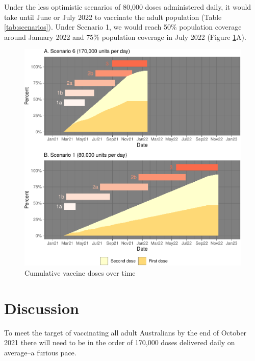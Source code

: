\documentclass{article}
\begin{document}
Under the less optimistic scenarios of 80,000 doses administered daily,
it would take until June or July 2022 to vaccinate the adult population
(Table \ref{tab:scenarios}). Under Scenario 1, we would reach 50\%
population coverage around January 2022 and 75\% population coverage in
July 2022 (Figure \ref{fig:cumlResults}A).

\begin{figure}

{\centering \includegraphics{researchNote_files/figure-latex/cumlResults-1} 

}

\caption{Cumulative vaccine doses over time}\label{fig:cumlResults}
\end{figure}

\hypertarget{discussion}{%
\section{Discussion}\label{discussion}}

To meet the target of vaccinating all adult Australians by the end of
October 2021 there will need to be in the order of 170,000 doses
delivered daily on average--a furious pace.
\end{document}

